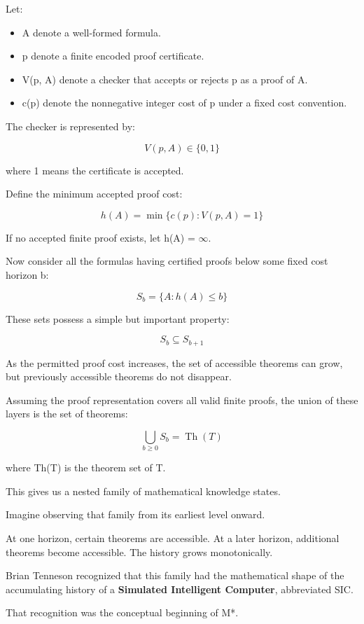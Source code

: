 \documentclass[11pt,letterpaper]{article}
\providecommand{\tightlist}{\setlength{\itemsep}{0pt}\setlength{\parskip}{0pt}}
\begin{document}
Let:

\begin{itemize}
\tightlist
\item
  A denote a well-formed formula.
\item
  p denote a finite encoded proof certificate.
\item
  V(p, A) denote a checker that accepts or rejects p as a proof of A.
\item
  c(p) denote the nonnegative integer cost of p under a fixed cost convention.
\end{itemize}

The checker is represented by:

\[V(p,A) \in \{0,1\}\]

where 1 means the certificate is accepted.

Define the minimum accepted proof cost:

\[h(A)=\min\{c(p):V(p,A)=1\}\]

If no accepted finite proof exists, let h(A) = \ensuremath{\infty}.

Now consider all the formulas having certified proofs below some fixed cost horizon b:

\[S_b=\{A:h(A)\le b\}\]

These sets possess a simple but important property:

\[S_b\subseteq S_{b+1}\]

As the permitted proof cost increases, the set of accessible theorems can grow, but previously accessible theorems do not disappear.

Assuming the proof representation covers all valid finite proofs, the union of these layers is the set of theorems:

\[\bigcup_{b\ge0} S_b=\operatorname{Th}(T)\]

where Th(T) is the theorem set of T.

This gives us a nested family of mathematical knowledge states.

Imagine observing that family from its earliest level onward.

At one horizon, certain theorems are accessible. At a later horizon, additional theorems become accessible. The history grows monotonically.

Brian Tenneson recognized that this family had the mathematical shape of the accumulating history of a \textbf{Simulated Intelligent Computer}, abbreviated SIC.

That recognition was the conceptual beginning of M*.
\end{document}
